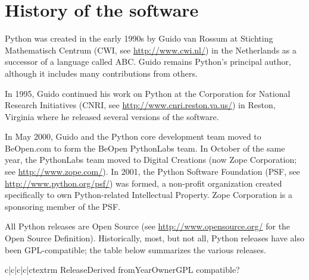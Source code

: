 \section{History of the software}

Python was created in the early 1990s by Guido van Rossum at Stichting
Mathematisch Centrum (CWI, see \url{http://www.cwi.nl/}) in the Netherlands
as a successor of a language called ABC.  Guido remains Python's
principal author, although it includes many contributions from others.

In 1995, Guido continued his work on Python at the Corporation for
National Research Initiatives (CNRI, see \url{http://www.cnri.reston.va.us/})
in Reston, Virginia where he released several versions of the
software.

In May 2000, Guido and the Python core development team moved to
BeOpen.com to form the BeOpen PythonLabs team.  In October of the same
year, the PythonLabs team moved to Digital Creations (now Zope
Corporation; see \url{http://www.zope.com/}).  In 2001, the Python
Software Foundation (PSF, see \url{http://www.python.org/psf/}) was
formed, a non-profit organization created specifically to own
Python-related Intellectual Property.  Zope Corporation is a
sponsoring member of the PSF.

All Python releases are Open Source (see
\url{http://www.opensource.org/} for the Open Source Definition).
Historically, most, but not all, Python releases have also been
GPL-compatible; the table below summarizes the various releases.

\begin{tablev}{c|c|c|c|c}{textrm}%
  {Release}{Derived from}{Year}{Owner}{GPL compatible?}
\end{tablev}

